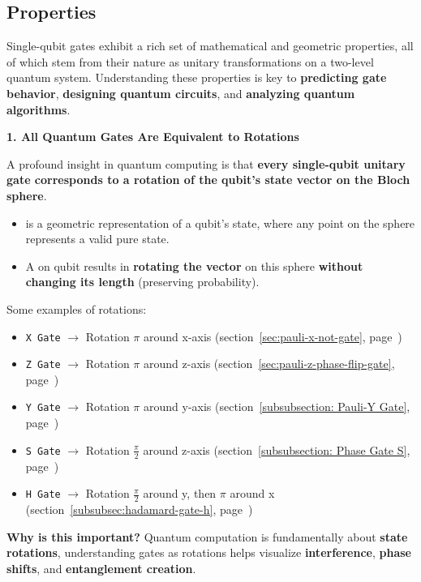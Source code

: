 \subsection{Properties}

Single-qubit gates exhibit a rich set of mathematical and geometric properties, all of which stem from their nature as unitary transformations on a two-level quantum system. Understanding these properties is key to \textbf{predicting gate behavior}, \textbf{designing quantum circuits}, and \textbf{analyzing quantum algorithms}.

\highspace
\begin{flushleft}
    \textcolor{Green3}{\textbf{1. All Quantum Gates Are Equivalent to Rotations}}
\end{flushleft}
A profound insight in quantum computing is that \textbf{every single-qubit unitary gate corresponds to a rotation of the qubit's state vector on the Bloch sphere}.
\begin{itemize}
    \item {} is a geometric representation of a qubit's state, where any point on the sphere represents a valid pure state.
    \item A  on qubit results in \textbf{rotating the vector} on this sphere \textbf{without changing its length} (preserving probability).
\end{itemize}
Some examples of rotations:
\begin{itemize}
    \item \texttt{X Gate} $\rightarrow$ Rotation $\pi$ around x-axis (section~\ref{sec:pauli-x-not-gate}, page~\pageref{sec:pauli-x-not-gate})
    \item \texttt{Z Gate} $\rightarrow$ Rotation $\pi$ around z-axis (section~\ref{sec:pauli-z-phase-flip-gate}, page~\pageref{sec:pauli-z-phase-flip-gate})
    \item \texttt{Y Gate} $\rightarrow$ Rotation $\pi$ around y-axis (section~\ref{subsubsection: Pauli-Y Gate}, page~\pageref{subsubsection: Pauli-Y Gate})
    \item \texttt{S Gate} $\rightarrow$ Rotation $\frac{\pi}{2}$ around z-axis (section~\ref{subsubsection: Phase Gate S}, page~\pageref{subsubsection: Phase Gate S})
    \item \texttt{H Gate} $\rightarrow$ Rotation $\frac{\pi}{2}$ around y, then $\pi$ around x (section~\ref{subsubsec:hadamard-gate-h}, page~\pageref{subsubsec:hadamard-gate-h})
\end{itemize}
\textcolor{Green3}{ \textbf{Why is this important?}} Quantum computation is fundamentally about \textbf{state rotations}, understanding gates as rotations helps visualize \textbf{interference}, \textbf{phase shifts}, and \textbf{entanglement creation}.

